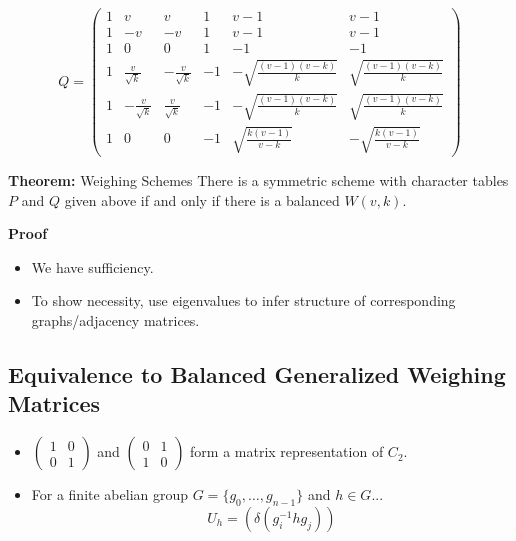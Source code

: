\documentclass{beamer}
\begin{document}
\begin{frame}

  \[
    Q = \begin{pmatrix}
          1 & v & v & 1 & v-1 & v-1 \\
          1 & -v & -v & 1 & v-1 & v-1 \\
          1 & 0 & 0 & 1 & -1 & -1 \\
          1 & \frac{v}{\sqrt{k}} & -\frac{v}{\sqrt{k}} & -1 & -\sqrt{\frac{(v-1)(v-k)}{k}} & \sqrt{\frac{(v-1)(v-k)}{k}} \\
          1 & -\frac{v}{\sqrt{k}} & \frac{v}{\sqrt{k}} & -1 & -\sqrt{\frac{(v-1)(v-k)}{k}} & \sqrt{\frac{(v-1)(v-k)}{k}} \\
          1 & 0 & 0 & -1 & \sqrt{\frac{k(v-1)}{v-k}} & -\sqrt{\frac{k(v-1)}{v-k}}
        \end{pmatrix}
  \]
  
\end{frame}

\begin{frame}

  \begin{block}{{\bf Theorem:} Weighing Schemes \cite[][]{new-bw}}
    There is a symmetric scheme with character tables $P$ and $Q$ given above
    if and only if there is a balanced $W(v,k)$.
  \end{block}

  \begin{block}{{\bf Proof}}
    \begin{itemize}
    \item We have sufficiency.
    \item To show necessity, use eigenvalues to infer structure of corresponding
      graphs/adjacency matrices.
    \end{itemize}
  \end{block}
  
\end{frame}


\subsection{Equivalence to Balanced Generalized Weighing Matrices}

\begin{frame}

  \begin{itemize}
  \item $\left( \begin{smallmatrix} 1&0\\0&1 \end{smallmatrix} \right)$ and
    $\left( \begin{smallmatrix} 0&1\\1&0 \end{smallmatrix} \right)$ form a
    matrix representation of $C_2$.
  \item For a finite abelian group $G=\{g_0,\dots,g_{n-1}\}$ and $h \in G$...
    \[
      U_h = (\delta(g_i^{-1}hg_j))
    \]
  \end{itemize}
  
\end{frame}
\end{document}
